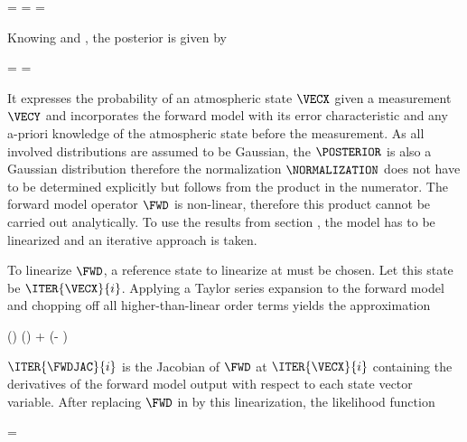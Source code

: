     \placesubformula
    \startformula
    \startalign[n=3,align={right,middle,left}]
        \NC \PROB{\VECY - \FWD(\VECX)} = \NC
            \GAUSS{\VECY - \FWD(\VECX)}{\MEANVECERR}{\COVMATERR} \NC \NR
        \NC = \NC \GAUSS{\VECY}{\FWD(\VECX)+\MEANVECERR}{\COVMATERR} \NC
            = \LIKELIHOOD \EQSTOP {}
    \stopalign
    \stopformula

    Knowing  and , the
    posterior {\PDF} is given by

    \startformula
        \POSTERIOR
        = \frac{\LIKELIHOOD \PRIOR}{\NORMALIZATION}
        = \frac{\GAUSS{\VECY}{\FWD(\VECX) + \MEANVECERR}{\COVMATERR}
            ~\GAUSS{\VECX}{\MEANVECA}{\COVMATA}}{\NORMALIZATION} \EQSTOP
    \stopformula

    It expresses the probability of an atmospheric state $\VECX$ given a
    measurement $\VECY$ and incorporates the forward model with its error
    characteristic and any a-priori knowledge of the atmospheric state before
    the measurement. As all involved distributions are assumed to be Gaussian,
    the $\POSTERIOR$ is also a Gaussian distribution therefore the
    normalization $\NORMALIZATION$ does not have to be determined explicitly
    but follows from the product in the numerator. The forward model operator
    $\FWD$ is non-linear, therefore this product cannot be carried out
    analytically. To use the results from section , the
    model has to be linearized and an iterative approach is taken.

\startsubsection[title=Iterative Solutions]

    To linearize $\FWD$, a reference state to linearize at must be chosen.
    Let this state be $\ITER{\VECX}{i}$. Applying a Taylor series
    expansion to the forward model and chopping off all higher-than-linear
    order terms yields the approximation

    \startformula
        \FWD(\VECX) \approx \FWD()
            +  (\VECX - ) \EQSTOP
    \stopformula

    $\ITER{\FWDJAC}{i}$ is the Jacobian of $\FWD$ at $\ITER{\VECX}{i}$
    containing the derivatives of the forward model output with respect to each
    state vector variable. After replacing $\FWD$ in
     by this linearization, the likelihood function

    \startformula
        \LIKELIHOOD = 
    \stopformula


